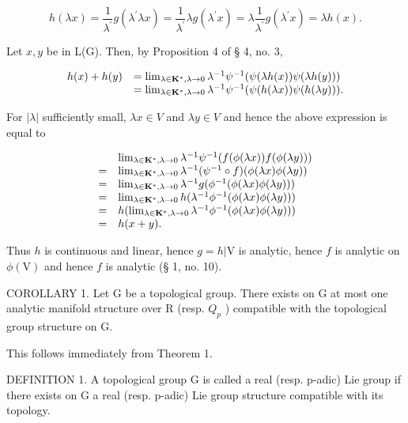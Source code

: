 \[
h (\lambda x) = \frac {1}{\lambda^ {\prime}} g \left(\lambda^ {\prime} \lambda x\right) = \frac {1}{\lambda^ {\prime}} \lambda g \left(\lambda^ {\prime} x\right) = \lambda \frac {1}{\lambda^ {\prime}} g \left(\lambda^ {\prime} x\right) = \lambda h (x).
\]

Let \(x, y\) be in L(G). Then, by Proposition 4 of § 4, no. 3,

\[
\begin{array}{r l} h (x) + h (y) & = \lim _ {\lambda \in \mathbf {K} ^ {*},   \lambda \to 0} \lambda^ {- 1} \psi^ {- 1} (\psi (\lambda h (x)) \psi (\lambda h (y))) \\ & = \lim _ {\lambda \in \mathbf {K} ^ {*},   \lambda \to 0} \lambda^ {- 1} \psi^ {- 1} (\psi (h (\lambda x)) \psi (h (\lambda y))). \end{array}
\]

For \(|\lambda|\) sufficiently small, \(\lambda x \in V\) and \(\lambda y \in V\) and hence the above expression is equal to

\[
\begin{array}{r l} & \lim _ {\lambda \in \mathbf {K} ^ {*}, \lambda \to 0} \lambda^ {- 1} \psi^ {- 1} (f (\phi (\lambda x)) f (\phi (\lambda y))) \\ = & \lim _ {\lambda \in \mathbf {K} ^ {*}, \lambda \to 0} \lambda^ {- 1} (\psi^ {- 1} \circ f) (\phi (\lambda x) \phi (\lambda y)) \\ = & \lim _ {\lambda \in \mathbf {K} ^ {*}, \lambda \to 0} \lambda^ {- 1} g (\phi^ {- 1} (\phi (\lambda x) \phi (\lambda y))) \\ = & \lim _ {\lambda \in \mathbf {K} ^ {*}, \lambda \to 0} h (\lambda^ {- 1} \phi^ {- 1} (\phi (\lambda x) \phi (\lambda y))) \\ = & h (\lim _ {\lambda \in \mathbf {K} ^ {*}, \lambda \to 0} \lambda^ {- 1} \phi^ {- 1} (\phi (\lambda x) \phi (\lambda y))) \\ = & h (x + y). \end{array}
\]

Thus \(h\) is continuous and linear, hence \(g = h|\mathrm{V}\) is analytic, hence \(f\) is analytic on \(\phi(\mathrm{V})\) and hence \(f\) is analytic (§ 1, no. 10).

COROLLARY 1. Let G be a topological group. There exists on G at most one analytic manifold structure over R (resp. \(Q_{p}\) ) compatible with the topological group structure on G.

This follows immediately from Theorem 1.

DEFINITION 1. A topological group G is called a real (resp. p-adic) Lie group if there exists on G a real (resp. p-adic) Lie group structure compatible with its topology.


